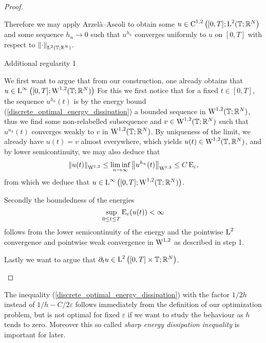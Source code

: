 \begin{proof}
\begin{description}[wide=0pt]
	Therefore we may apply Arzelà--Ascoli to obtain some $ u \in \operatorname{C}^{ 1 , 2 } \left( [ 0, T ] ; \operatorname{L}^{ 2 } ( \mathbb{ T } ; \mathbb{ R }^{ N } \right) $ and some  sequence $ h_{ n } \to 0 $ such that
	$ u^{ h_{ n } } $ converges uniformly to $ u $ on $ [ 0 , T ] $ with respect to $ \norm{ \cdot }_{ \operatorname{L}^{ 2 } ( \mathbb{ T } ; \mathbb{ R }^{ N } ) } $.
	
	\item[Step 6:] Additional regularity 1
	
	We first want to argue that from our construction, one already obtains that $ u \in \operatorname{L}^{ \infty } \left( [ 0 , T ] ; \operatorname{W}^{ 1, 2 } ( \mathbb{ T } ; \mathbb{ R }^{ N } ) \right) $
	For this we first notice that for a fixed $ t \in [ 0 , T ] $, the sequence $ u^{ h_{ n } } ( t ) $ is by the energy bound (\ref{discrete_optimal_energy_dissipation}) a bounded sequence in $ \operatorname{W}^{ 1 , 2 } ( \mathbb{ T } ; \mathbb{ R }^{ N } ) $, thus we find some non-relabelled subsequence and $ v \in \operatorname{W}^{ 1 , 2 } ( \mathbb{ T } ; \mathbb{ R }^{ N } ) $ such that $ u^{ n_{h } } ( t ) $ converges weakly to $ v $ in $ \operatorname{W}^{ 1 , 2 } ( \mathbb{ T } ; \mathbb{ R }^{ N } ) $. By uniqueness of the limit, we already have $ u ( t ) = v $ almost everywhere, which yields $ u ( t ) \in \operatorname{W}^{ 1 , 2 } ( \mathbb{ T }, \mathbb{ R }^{ N } ) $, and by lower semicontinuity, we may also deduce that
	\begin{equation*}
		\norm{ u ( t ) }_{ \operatorname{W}^{ 1 , 2 } }
		\leq
		\liminf_{ n \to \infty }
			\norm{ u^{ h_{ n } } ( t ) }_{ \operatorname{W}^{ 1 , 2 } }
		\leq
		C \operatorname{E}_{ \varepsilon },
	\end{equation*}
	from which we deduce that $ u \in \operatorname{L}^{ \infty } \left( [ 0 , T ] ; \operatorname{W}^{ 1 , 2 } ( \mathbb{ T } ; \mathbb{ R }^{ N } ) \right) $.	
	
	Secondly the boundedness of the energies
	\begin{equation*}
		\sup_{ 0 \leq t \leq T }
			\operatorname{E}_{ \varepsilon } ( u ( t ) ) 
		< \infty
	\end{equation*}
	follows from the lower semicontinuity of the energy and the pointwise $ \operatorname{L}^{ 2 } $ convergence and pointwise weak convergence in $ \operatorname{W}^{ 1 , 2 } $ as described in step 1.
	
	Lastly we want to argue that $ \partial_{ t } u \in \operatorname{L}^{2 } \left( [ 0 , T ] \times \mathbb{ T } ; \mathbb{ R }^{ N } \right) $.
	\end{description}
\end{proof}

\begin{remark}
	The inequality (\ref{discrete_optimal_energy_dissipation}) with the factor $ 1/2h $ instead of $ 1/h- C/2\varepsilon $ follows immediately from the definition of our optimization problem, but is not optimal for fixed $ \varepsilon $ if we want to study the behaviour as $ h $ tends to zero. Moreover this so called \emph{sharp energy dissipation inequality} is important for later.
\end{remark}







